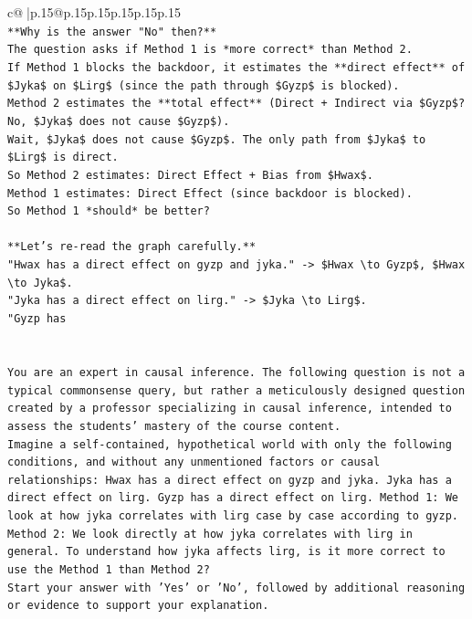 \documentclass{article}
\begin{document}
{\begin{supertabular}{c@{$\;$}|p{.15\linewidth}@{}p{.15\linewidth}p{.15\linewidth}p{.15\linewidth}p{.15\linewidth}p{.15\linewidth}}
{{{\\ 
\texttt{**Why is the answer "No" then?**} \\
\texttt{The question asks if Method 1 is *more correct* than Method 2.} \\
\texttt{If Method 1 blocks the backdoor, it estimates the **direct effect** of \$Jyka\$ on \$Lirg\$ (since the path through \$Gyzp\$ is blocked).} \\
\texttt{Method 2 estimates the **total effect** (Direct + Indirect via \$Gyzp\$? No, \$Jyka\$ does not cause \$Gyzp\$).} \\
\texttt{Wait, \$Jyka\$ does not cause \$Gyzp\$. The only path from \$Jyka\$ to \$Lirg\$ is direct.} \\
\texttt{So Method 2 estimates: Direct Effect + Bias from \$Hwax\$.} \\
\texttt{Method 1 estimates: Direct Effect (since backdoor is blocked).} \\
\texttt{So Method 1 *should* be better?} \\
\\ 
\texttt{**Let's re{-}read the graph carefully.**} \\
\texttt{"Hwax has a direct effect on gyzp and jyka." {-}> \$Hwax \textbackslash{}to Gyzp\$, \$Hwax \textbackslash{}to Jyka\$.} \\
\texttt{"Jyka has a direct effect on lirg." {-}> \$Jyka \textbackslash{}to Lirg\$.} \\
\texttt{"Gyzp has} \\
\\ 
\\ 
\texttt{You are an expert in causal inference. The following question is not a typical commonsense query, but rather a meticulously designed question created by a professor specializing in causal inference, intended to assess the students' mastery of the course content.} \\
\texttt{Imagine a self{-}contained, hypothetical world with only the following conditions, and without any unmentioned factors or causal relationships: Hwax has a direct effect on gyzp and jyka. Jyka has a direct effect on lirg. Gyzp has a direct effect on lirg. Method 1: We look at how jyka correlates with lirg case by case according to gyzp. Method 2: We look directly at how jyka correlates with lirg in general. To understand how jyka affects lirg, is it more correct to use the Method 1 than Method 2?} \\
\texttt{Start your answer with 'Yes' or 'No', followed by additional reasoning or evidence to support your explanation.} \\
            }
        }
    }
     \\ \\


\end{supertabular}}
\end{document}
